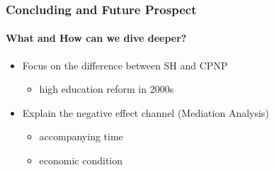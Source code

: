 \documentclass{beamer}
\begin{document}
\begin{frame} %
\frametitle{Concluding and Future Prospect}
\framesubtitle{What and How can we dive deeper?}

    \begin{itemize}
        \item Focus on the difference between SH and CPNP
        \begin{itemize}
        \item high education reform in 2000s
        \end{itemize}
        \item Explain the negative effect channel (Mediation Analysis)
        \begin{itemize}
        \item accompanying time
        \item economic condition
        \end{itemize}
    \end{itemize}

\end{frame}
\end{document}
